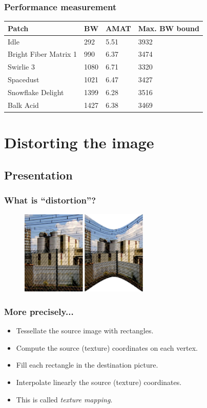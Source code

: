 \documentclass{beamer}
\begin{document}
\frame
{
  \frametitle{Performance measurement}

  \begin{tabular}{|l|l|l|l|}
  \hline
  \textbf{Patch} & BW & AMAT & Max. BW bound \\
  \hline
  Idle & 292 & 5.51 & 3932 \\
  \hline
  Bright Fiber Matrix 1 & 990 & 6.37 & 3474 \\
  \hline
  Swirlie 3 & 1080 & 6.71 & 3320 \\
  \hline
  Spacedust & 1021 & 6.47 & 3427 \\
  \hline
  Snowflake Delight & 1399 & 6.28 & 3516 \\
  \hline
  Balk Acid & 1427 & 6.38 & 3469 \\
  \hline
   \end{tabular}
}


\section{Distorting the image}
\subsection{Presentation}
\frame
{
  \frametitle{What is ``distortion''?}

  \begin{figure}[H]
  \includegraphics[height=40mm]{distortionsanofi.eps}
  \end{figure}
}

\frame
{
  \frametitle{More precisely...}
  \begin{itemize}
  \item Tessellate the source image with rectangles.
  \item Compute the source (texture) coordinates on each vertex.
  \item Fill each rectangle in the destination picture.
  \item Interpolate linearly the source (texture) coordinates.
  \item This is called \textit{texture mapping}.
  \end{itemize}
}
\end{document}
